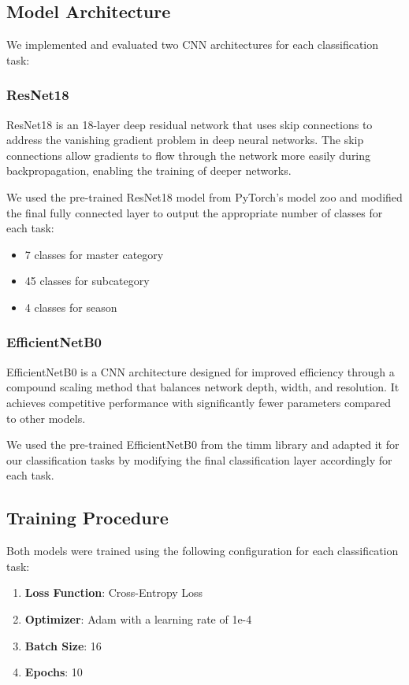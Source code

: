 \documentclass[10pt,journal,compsoc]{IEEEtran}
\begin{document}
\subsection{Model Architecture}

We implemented and evaluated two CNN architectures for each classification task:

\subsubsection{ResNet18}
ResNet18 is an 18-layer deep residual network that uses skip connections to address the vanishing gradient problem in deep neural networks. The skip connections allow gradients to flow through the network more easily during backpropagation, enabling the training of deeper networks.

We used the pre-trained ResNet18 model from PyTorch's model zoo and modified the final fully connected layer to output the appropriate number of classes for each task:
\begin{itemize}
\item 7 classes for master category
\item 45 classes for subcategory
\item 4 classes for season
\end{itemize}

\subsubsection{EfficientNetB0}
EfficientNetB0 is a CNN architecture designed for improved efficiency through a compound scaling method that balances network depth, width, and resolution. It achieves competitive performance with significantly fewer parameters compared to other models.

We used the pre-trained EfficientNetB0 from the timm library and adapted it for our classification tasks by modifying the final classification layer accordingly for each task.

\subsection{Training Procedure}
Both models were trained using the following configuration for each classification task:

\begin{enumerate}
\item \textbf{Loss Function}: Cross-Entropy Loss
\item \textbf{Optimizer}: Adam with a learning rate of 1e-4
\item \textbf{Batch Size}: 16
\item \textbf{Epochs}: 10
\end{enumerate}
\end{document}
